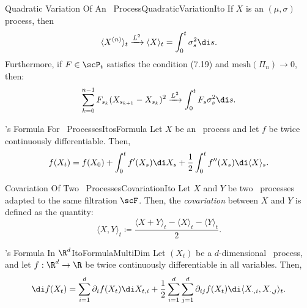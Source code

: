 \begin{thm}{Quadratic Variation Of An \Ito\ Process}{QuadraticVariationIto}
	If \(X\) is an \Ito\((\mu, \sigma)\) process, then
	\begin{equation}
		\langle X^{(n)} \rangle_t \xrightarrow{L^2} \langle X \rangle_t = \int_{0}^{t} \sigma_s^2 \di s.
	\end{equation}
	Furthermore, if \(F \in \scP_t\) satisfies the condition (7.19) and \(\mathrm{mesh}(\Pi_n) \to 0\), then:
	\begin{equation}
		\sum_{k=0}^{n-1} F_{s_k} (X_{s_{k+1}} - X_{s_k})^2 \xrightarrow{L^2} \int_{0}^{t} F_s \sigma_s^2 \di s.
	\end{equation}
\end{thm}

\begin{thm}{\Ito's Formula For \Ito\ Processes}{ItosFormula}
	Let \(X\) be an \Ito\ process and let \(f\) be twice continuously differentiable. Then,
	\begin{equation}
		f(X_t) = f(X_0) + \int_{0}^{t} f'(X_s) \di X_s + \frac{1}{2} \int_{0}^{t} f''(X_s) \di \langle X \rangle_s.
		\label{eq:ItoFormula}
	\end{equation}
\end{thm}

\begin{defn}{Covariation Of Two \Ito\ Processes}{CovariationIto}
	Let \(X\) and \(Y\) be two \Ito\ processes adapted to the same filtration \(\scF\). Then, the \textit{covariation} between \(X\) and \(Y\) is defined as the quantity:
	\begin{equation}
		\langle X, Y \rangle_t \coloneqq \frac{\langle X + Y \rangle_t - \langle X \rangle_t - \langle Y \rangle_t}{2}.
		\label{eq:CovariationDef}
	\end{equation}
\end{defn}

\begin{thm}{\Ito's Formula In \(\R^d\)}{ItoFormulaMultiDim}
	Let \((X_t)\) be a \(d\)-dimensional \Ito\ process, and let \(f : \R^d \to \R\) be twice continuously differentiable in all variables. Then,
	\begin{equation}
		\di f(X_t) = \sum_{i=1}^{d} \partial_i f(X_t) \di X_{t,i} + \frac{1}{2} \sum_{i=1}^{d} \sum_{j=1}^{d} \partial_{ij} f(X_t) \di \langle X_{\cdot, i}, X_{\cdot, j} \rangle_t.
		\label{eq:DifferentialItoMulti}
	\end{equation}
\end{thm}

